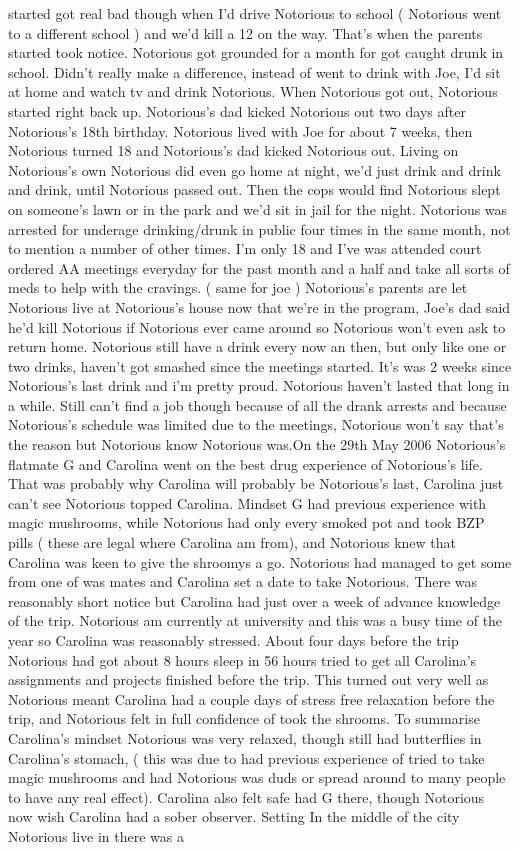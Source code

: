\documentclass[12pt]{book}
\begin{document}
started got real bad though when I'd drive Notorious to school ( Notorious went to a different school ) and we'd kill a 12 on the way. That's when the parents started took notice. Notorious got grounded for a month for got caught drunk in school. Didn't really make a difference, instead of went to drink with Joe, I'd sit at home and watch tv and drink Notorious. When Notorious got out, Notorious started right back up. Notorious's dad kicked Notorious out two days after Notorious's 18th birthday. Notorious lived with Joe for about 7 weeks, then Notorious turned 18 and Notorious's dad kicked Notorious out. Living on Notorious's own Notorious did even go home at night, we'd just drink and drink and drink, until Notorious passed out. Then the cops would find Notorious slept on someone's lawn or in the park and we'd sit in jail for the night. Notorious was arrested for underage drinking/drunk in public four times in the same month, not to mention a number of other times. I'm only 18 and I've was attended court ordered AA meetings everyday for the past month and a half and take all sorts of meds to help with the cravings. ( same for joe ) Notorious's parents are let Notorious live at Notorious's house now that we're in the program, Joe's dad said he'd kill Notorious if Notorious ever came around so Notorious won't even ask to return home. Notorious still have a drink every now an then, but only like one or two drinks, haven't got smashed since the meetings started. It's was 2 weeks since Notorious's last drink and i'm pretty proud. Notorious haven't lasted that long in a while. Still can't find a job though because of all the drank arrests and because Notorious's schedule was limited due to the meetings, Notorious won't say that's the reason but Notorious know Notorious was.On the 29th May 2006 Notorious's flatmate G and Carolina went on the best drug experience of Notorious's life. That was probably why Carolina will probably be Notorious's last, Carolina just can't see Notorious topped Carolina. Mindset G had previous experience with magic mushrooms, while Notorious had only every smoked pot and took BZP pills ( these are legal where Carolina am from), and Notorious knew that Carolina was keen to give the shroomys a go. Notorious had managed to get some from one of was mates and Carolina set a date to take Notorious. There was reasonably short notice but Carolina had just over a week of advance knowledge of the trip. Notorious am currently at university and this was a busy time of the year so Carolina was reasonably stressed. About four days before the trip Notorious had got about 8 hours sleep in 56 hours tried to get all Carolina's assignments and projects finished before the trip. This turned out very well as Notorious meant Carolina had a couple days of stress free relaxation before the trip, and Notorious felt in full confidence of took the shrooms. To summarise Carolina's mindset Notorious was very relaxed, though still had butterflies in Carolina's stomach, ( this was due to had previous experience of tried to take magic mushrooms and had Notorious was duds or spread around to many people to have any real effect). Carolina also felt safe had G there, though Notorious now wish Carolina had a sober observer. Setting In the middle of the city Notorious live in there was a 
\end{document}
